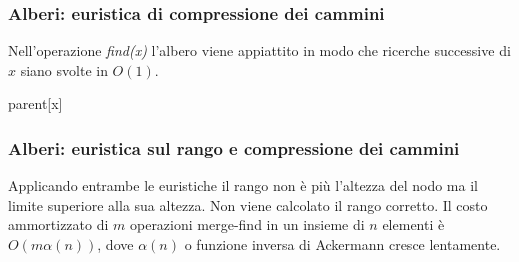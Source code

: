 \subsubsection{Alberi: euristica di compressione dei cammini}
\begin{multicols}{2}
Nell'operazione \emph{find(x)} l'albero viene appiattito in modo che ricerche successive di $x$ siano svolte in $O(1)$.
\begin{algorithm}[H]
\DontPrintSemicolon
{}





\caption{\protect\Int \protect{}}
\Return parent[x]\;
\end{algorithm}
\end{multicols}
\subsubsection{Alberi: euristica sul rango e compressione dei cammini}
Applicando entrambe le euristiche il rango non \`e pi\`u l'altezza del nodo ma il limite superiore alla sua altezza. Non viene calcolato il rango corretto. Il costo ammortizzato di $m$ operazioni merge-find in un 
insieme di $n$ elementi \`e $O(m\alpha(n))$, dove $\alpha(n)$ o funzione inversa di Ackermann cresce lentamente. 